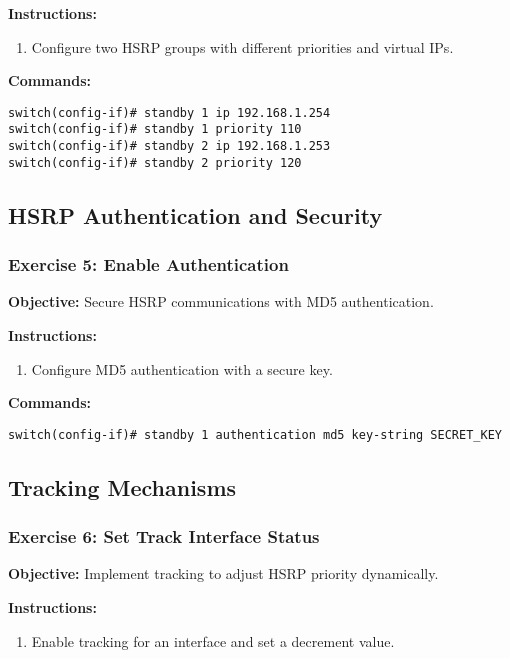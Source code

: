 \documentclass[12pt]{article}
\begin{document}
\textbf{Instructions:}
\begin{enumerate}
\item Configure two HSRP groups with different priorities and virtual IPs.
\end{enumerate}

\textbf{Commands:}
\begin{lstlisting}[style=CiscoCLI]
switch(config-if)# standby 1 ip 192.168.1.254
switch(config-if)# standby 1 priority 110
switch(config-if)# standby 2 ip 192.168.1.253
switch(config-if)# standby 2 priority 120
\end{lstlisting}

\bigskip

\subsection{HSRP Authentication and Security}

\subsubsection*{Exercise 5: Enable Authentication}
\textbf{Objective:} Secure HSRP communications with MD5 authentication.

\textbf{Instructions:}
\begin{enumerate}
\item Configure MD5 authentication with a secure key.
\end{enumerate}

\textbf{Commands:}
\begin{lstlisting}[style=CiscoCLI]
switch(config-if)# standby 1 authentication md5 key-string SECRET_KEY
\end{lstlisting}

\bigskip

\subsection{Tracking Mechanisms}

\subsubsection*{Exercise 6: Set Track Interface Status}
\textbf{Objective:} Implement tracking to adjust HSRP priority dynamically.

\textbf{Instructions:}
\begin{enumerate}
\item Enable tracking for an interface and set a decrement value.
\end{enumerate}
\end{document}
